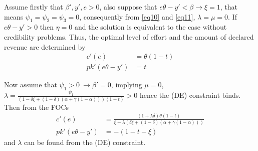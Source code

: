 \documentclass[a4paper]{article}
\begin{document}
Assume firstly that $\beta', y', e >0$, also suppose that $e\theta - y' < \beta \to \xi = 1$, that means $\psi_1 = \psi_2=\psi_3 = 0$, consequently from \eqref{eq10} and \eqref{eq11}, $\lambda = \mu = 0$. If $e \theta - y' > 0$ then $\eta = 0$ and the solution is equivalent to the case without credibility problems. Thus, the optimal level of effort and the amount of declared revenue are determined by
\begin{align*}
c'(e) &= \theta(1 - t)\\
pk'(e\theta - y') &= t
\end{align*}


Now assume that $\psi_1 > 0\ \to \beta' = 0$, implying $\mu = 0$, $\lambda = \frac{\psi_1}{(1 - \delta \xi + (1 - \delta)(\alpha + \gamma(1 - \alpha)))(1-t)}$$> 0$ hence the (DE) constraint binds. Then from the FOCs
\begin{align*}
c'(e) &= \frac{(1 + \lambda \delta)\theta(1-t)}{\xi+\lambda(\delta\xi + (1 - \delta)(\alpha + \gamma(1 - \alpha)))}\\
pk'(e\theta - y') &= -(1 - t - \xi)
\end{align*}
and $\lambda$ can be found from the (DE) constraint.
\end{document}
